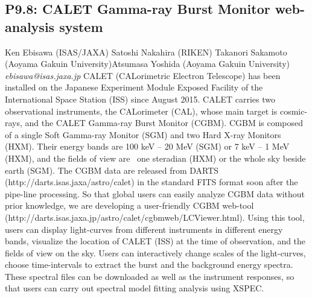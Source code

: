 \documentclass{report}
\begin{document}
\subsection*{P9.8: CALET Gamma-ray Burst Monitor web-analysis system}
\bigskip
Ken Ebisawa (ISAS/JAXA) \newline Satoshi Nakahira (RIKEN) \newline  Takanori Sakamoto (Aoyama Gakuin University)\newline  Atsumasa Yoshida (Aoyama Gakuin University)\newline  \newline  \newline\newline
{\it ebisawa@isas.jaxa.jp}\newline
\newline\newline
CALET (CALorimetric Electron Telescope) has been installed on the Japanese
Experiment Module Exposed Facility of the International
Space Station (ISS) since August 2015. CALET carries  two observational instruments, the CALorimeter (CAL), whose
main target is  cosmic-rays, and the CALET Gamma-ray Burst Monitor (CGBM).
CGBM is composed of a single Soft Gamma-ray Monitor (SGM) and two
Hard X-ray Monitors (HXM).  Their energy bands are 100 keV -- 20 MeV (SGM) or 7
keV -- 1 MeV (HXM), and the fields of view are ~one steradian (HXM)
or  the whole sky beside earth (SGM).
The CGBM data are released from DARTS
(http://darts.isas.jaxa/astro/calet) in the standard FITS format soon
after the pipe-line processing.
So that global users can easily analyze  CGBM data without prior knowledge, we   are
developing a user-friendly  CGBM web-tool
(http://darts.isas.jaxa.jp/astro/calet/cgbmweb/LCViewer.html).
Using this tool, users can display light-curves from different
instruments in different energy bands, visualize the location of CALET (ISS) at the
time of  observation, and the fields of view on the sky.
Users can interactively change scales of the light-curves, choose
time-intervals to extract the burst and the background  energy spectra.
These spectral files  can  be downloaded as well as
the instrument responses, so that users can carry out spectral model
fitting analysis using XSPEC.\newline
\newpage
\end{document}
